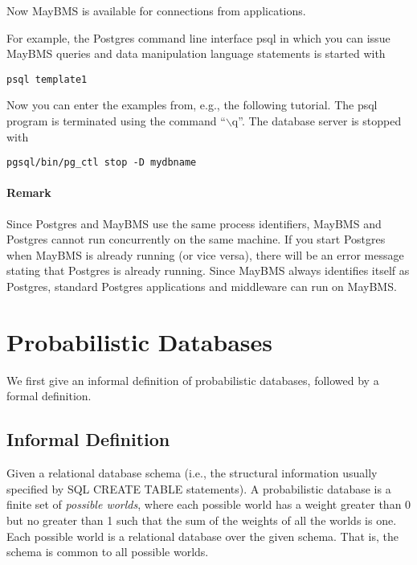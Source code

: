 Now MayBMS is available for connections from applications.

For example, the Postgres command line interface psql
in which you can issue MayBMS queries
and data manipulation language statements is started with
\begin{verbatim}
psql template1
\end{verbatim}
Now you can enter the examples from, e.g., the following tutorial.
The psql program is terminated using the command ``$\backslash$q''.
The database server is stopped with
\begin{verbatim}
pgsql/bin/pg_ctl stop -D mydbname
\end{verbatim}


\subsubsection{Remark}


Since Postgres and MayBMS use the same process identifiers,
MayBMS and Postgres cannot run concurrently on the same machine.
If you start Postgres when MayBMS is already running
(or vice versa), there will be an error message stating that Postgres is
already running. Since MayBMS always identifies itself as Postgres,
standard Postgres applications and middleware can run on MayBMS.  


\chapter{Probabilistic Databases}


We first give an informal definition of probabilistic databases, followed
by a formal definition.


\section{Informal Definition}


Given a relational database schema (i.e., the structural information usually
specified by SQL CREATE TABLE statements).
A probabilistic database is a finite set of {\em possible worlds}\/, where each
possible world has a weight greater than 0 but no greater than 1
such that the sum of the weights
of all the worlds is one.
Each possible world is a relational database over the given
schema. That is, the schema is common to all possible worlds.

